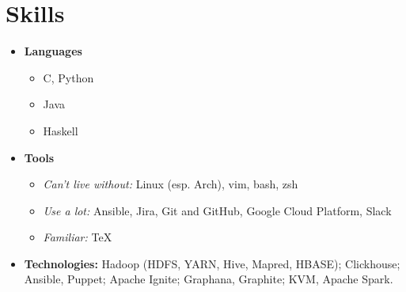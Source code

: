 \documentclass[letterpaper,10pt]{article}
\begin{document}
\begin{minipage}[t]{0.33\textwidth} 

\section{Skills}
\begin{itemize}[leftmargin=*]
	\item{ \textbf{Languages}{\vspace{-8pt}}
		 \begin{itemize}
			 \item{C, Python}
			 \item{Java}
			 \item{Haskell}
		\end{itemize}
    }
	\item{ \textbf{Tools}{\vspace{-8pt}}
		 \begin{itemize}
			 \item{\textit{\small{Can't live without:}}\newline}
			Linux (esp. Arch), vim, bash, zsh
			  \item{\textit{\small{Use a lot:}}\newline}
			 Ansible, Jira, Git and GitHub, Google Cloud Platform, Slack
			 \item{\textit{\small{Familiar:}}\newline}
			 TeX
		\end{itemize}

    }
	\item{ \textbf{Technologies:}{\vspace{-0pt}}\newline
		Hadoop (HDFS, YARN, Hive, Mapred, HBASE); \newline
		Clickhouse;                             \newline
		Ansible, Puppet;                        \newline
		Apache Ignite;                           \newline
		Graphana, Graphite;                      \newline
		KVM, Apache Spark.
    }
 \end{itemize}
 



\end{minipage}
\end{document}
